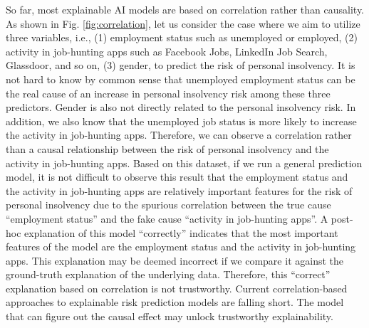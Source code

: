 \documentclass[letterpaper]{article} %
\theoremstyle{definition}
\theoremstyle{remark}
\begin{document}
So far, most explainable AI models are based on correlation rather than causality. As shown in Fig. \ref{fig:correlation}, let us consider the case where we aim to utilize three variables, i.e., (1) employment status such as unemployed or employed, (2) activity in job-hunting apps such as Facebook Jobs, LinkedIn Job Search, Glassdoor, and so on, (3) gender, to predict the risk of personal insolvency. It is not hard to know by common sense that unemployed employment status can be the real cause of an increase in personal insolvency risk among these three predictors. Gender is also not directly related to the personal insolvency risk. In addition, we also know that the unemployed job status is more likely to increase the activity in job-hunting apps. Therefore, we can observe a correlation rather than a causal relationship between the risk of personal insolvency and the activity in job-hunting apps. Based on this dataset, if we run a general prediction model, it is not difficult to observe this result that the employment status and the activity in job-hunting apps are relatively important features for the risk of personal insolvency due to the spurious correlation between the true cause ``employment status'' and the fake cause ``activity in job-hunting apps''. A post-hoc explanation of this model ``correctly'' indicates that the most important features of the model are the employment status and the activity in job-hunting apps. This explanation may be deemed incorrect if we compare it against the ground-truth explanation of the underlying data. Therefore, this ``correct'' explanation based on correlation is not trustworthy. Current correlation-based approaches to explainable risk prediction models are falling short. 
The model that can figure out the causal effect may unlock trustworthy explainability.
\end{document}
